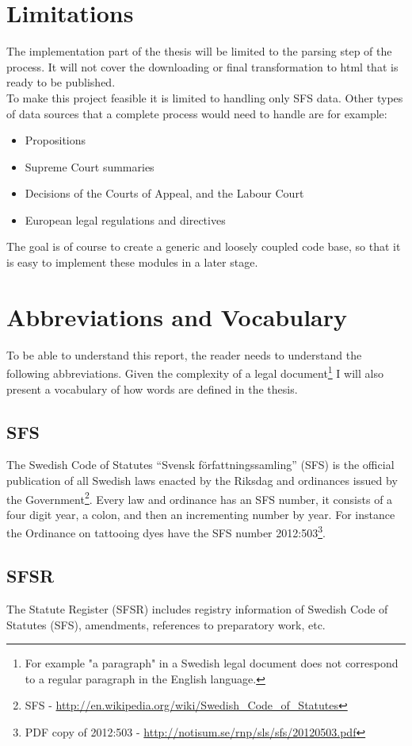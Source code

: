 \documentclass[a4paper,11pt]{kth-mag}
\begin{document}
\section{Limitations}
The implementation part of the thesis will be limited to the parsing step of the process. It will not cover the downloading or final transformation to html that is ready to be published.\\
To make this project feasible it is limited to handling only SFS data. Other types of data sources that a complete process would need to handle are for example: 
\begin{itemize}
\item Propositions
\item Supreme Court summaries
\item Decisions of the Courts of Appeal, and the Labour Court 
\item European legal regulations and directives
\end{itemize}
The goal is of course to create a generic and loosely coupled code base, so that it is easy to implement these 
modules in a later stage. 

\section{Abbreviations and Vocabulary} To be able to understand this report,
the reader needs to understand the following abbreviations. Given the
complexity of a legal document\footnote{For example "a paragraph" in a Swedish
legal document does not correspond to a regular paragraph in the English
language.} I will also present a vocabulary of how words are defined in the
thesis.

\subsection*{SFS} The Swedish Code of Statutes “Svensk författningssamling”
(SFS) is the official publication of all Swedish laws enacted by the Riksdag
and ordinances issued by the Government\footnote{SFS -
\url{http://en.wikipedia.org/wiki/Swedish_Code_of_Statutes}}. Every law and
ordinance has an SFS number, it consists of a four digit year, a colon, and
then an incrementing number by year. For instance the Ordinance on tattooing
dyes have the SFS number 2012:503\footnote{PDF copy of 2012:503 -
\url{http://notisum.se/rnp/sls/sfs/20120503.pdf}}.

\subsection*{SFSR}
The Statute Register (SFSR) includes registry information of Swedish Code
of Statutes (SFS), amendments, references to preparatory work, etc.
\end{document}
